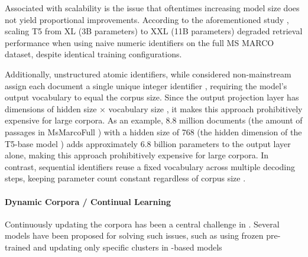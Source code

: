 Associated with scalability is the issue that oftentimes increasing model size does not yield proportional improvements. According to the aforementioned study \cite{ronak-pradeep-how-does}, scaling T5 from XL (3B parameters) to XXL (11B parameters) degraded retrieval performance when using naive numeric identifiers on the full MS MARCO dataset, despite identical training configurations.

Additionally, unstructured atomic identifiers, while considered non-mainstream %
assign each document a single unique integer identifier \cite{yi-tay-transformer-memory}, requiring the model's output vocabulary to equal the corpus size. Since the output projection layer has dimensions of hidden size × vocabulary size \cite{reusch-reverseengineering-the,yi-tay-transformer-memory}, %
it makes this approach prohibitively expensive for large corpora. As an example, 8.8 million documents (the amount of passages in MsMarcoFull \cite{payal-bajaj-ms-marco}) with a hidden size of 768 (the hidden dimension of the T5-base model \cite{colin-raffel-exploring-the})
adds approximately 6.8 billion parameters to the output layer alone, making this approach prohibitively expensive for large corpora. In contrast, sequential identifiers reuse a fixed vocabulary across multiple decoding steps, keeping parameter count constant regardless of corpus size \cite{tzulin-kuo-a-survey,ronak-pradeep-how-does}.

\paragraph{Dynamic Corpora / Continual Learning}
\label{dynamic-corpora}

Continuously updating the corpora has been a central challenge in . Several models have been proposed for solving such issues, such as using frozen pre-trained  \cite{varsha-kishore-incdsi-incrementally,guo-corpusbrain-a} %
and updating only specific  clusters in -based models \cite{chen-continual-learning}


